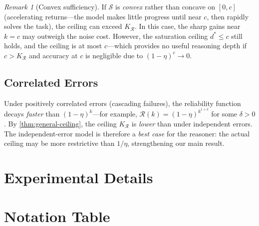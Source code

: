 \documentclass{article}
\theoremstyle{definition}
\theoremstyle{remark}
\newtheorem{remark}[theorem]{Remark}
\newcommand{\depth}{d^*}       %
\newcommand{\noise}{\eta}      %
\newcommand{\suf}{\mathcal{S}} %
\newcommand{\rel}{\mathcal{R}} %
\begin{document}
\begin{remark}[Convex sufficiency]
If $\suf$ is \emph{convex} rather than concave on $[0, c]$ (accelerating returns---the model makes little progress until near $c$, then rapidly solves the task), the ceiling can exceed $K_\rel$. In this case, the sharp gains near $k = c$ may outweigh the noise cost. However, the saturation ceiling $\depth \leq c$ still holds, and the ceiling is at most $c$---which provides no useful reasoning depth if $c > K_\rel$ and accuracy at $c$ is negligible due to $(1-\noise)^c \to 0$.
\end{remark}

\subsection{Correlated Errors}
\label{app:correlated}

Under positively correlated errors (cascading failures), the reliability function decays \emph{faster} than $(1-\noise)^k$---for example, $\rel(k) = (1-\noise)^{k^{1+\delta}}$ for some $\delta > 0$. By \cref{thm:general-ceiling}, the ceiling $K_\rel$ is \emph{lower} than under independent errors. The independent-error model is therefore a \emph{best case} for the reasoner: the actual ceiling may be more restrictive than $1/\noise$, strengthening our main result.

\section{Experimental Details}
\label{app:experiments}


\section{Notation Table}
\label{app:notation}
\end{document}
